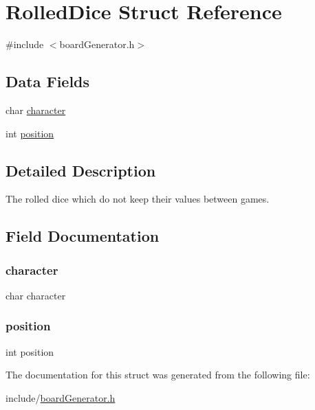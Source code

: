 \hypertarget{struct_rolled_dice}{}\section{Rolled\+Dice Struct Reference}
\label{struct_rolled_dice}


{\ttfamily \#include $<$board\+Generator.\+h$>$}

\subsection*{Data Fields}
\begin{DoxyCompactItemize}
\item 
char \hyperlink{struct_rolled_dice_ac6027d2dbb9ac08b3b6729341c0bcf8f}{character}
\item 
int \hyperlink{struct_rolled_dice_a401e942526aac47cef94f478182486e7}{position}
\end{DoxyCompactItemize}


\subsection{Detailed Description}
The rolled dice which do not keep their values between games. 

\subsection{Field Documentation}
\mbox{\label{struct_rolled_dice_ac6027d2dbb9ac08b3b6729341c0bcf8f}} 
\subsubsection{\texorpdfstring{character}{character}}
{\footnotesize\ttfamily char character}

\mbox{\label{struct_rolled_dice_a401e942526aac47cef94f478182486e7}} 
\subsubsection{\texorpdfstring{position}{position}}
{\footnotesize\ttfamily int position}



The documentation for this struct was generated from the following file\+:\begin{DoxyCompactItemize}
\item 
include/\hyperlink{board_generator_8h}{board\+Generator.\+h}\end{DoxyCompactItemize}
